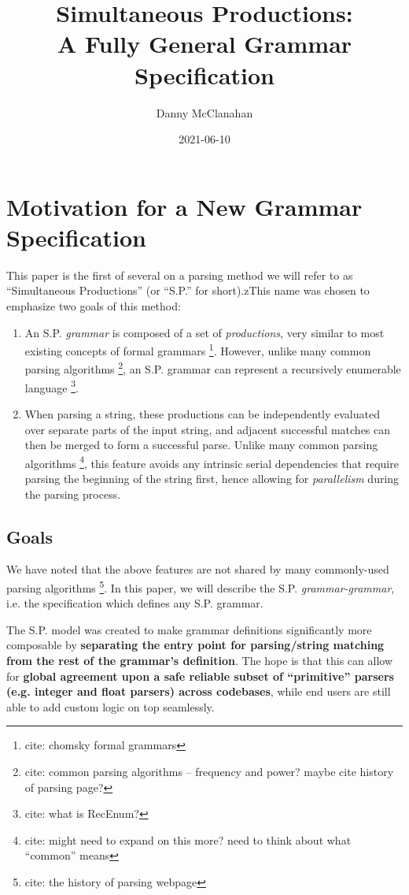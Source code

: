 \documentclass[10pt]{article}
\title{Simultaneous Productions: \\ A Fully General Grammar Specification}
\date{2021-06-10}
\author{Danny McClanahan}
\newcommand{\todocite}[1]{\footnote{cite: #1}}
\begin{document}
\maketitle
\tableofcontents

\section{Motivation for a New Grammar Specification}
\label{sec:motivation}

This paper is the first of several on a parsing method we will refer to as ``Simultaneous Productions'' (or ``S.P.'' for short).zThis name was chosen to emphasize two goals of this method:
\begin{enumerate}
  \item An S.P. \textit{grammar} is composed of a set of \textit{productions}, very similar to most existing concepts of formal grammars \todocite{chomsky formal grammars}. However, unlike many common parsing algorithms \todocite{common parsing algorithms -- frequency and power? maybe cite history of parsing page?}, an S.P. grammar can represent a recursively enumerable language \todocite{what is RecEnum?}.
  \item When parsing a string, these productions can be independently evaluated over separate parts of the input string, and adjacent successful matches can then be merged to form a successful parse. Unlike many common parsing algorithms \todocite{might need to expand on this more? need to think about what ``common'' means}, this feature avoids any intrinsic serial dependencies that require parsing the beginning of the string first, hence allowing for \textit{parallelism} during the parsing process.
\end{enumerate}

\subsection{Goals}
\label{sec:goals}
We have noted that the above features are not shared by many commonly-used parsing algorithms \todocite{the history of parsing webpage}. In this paper, we will describe the S.P. \textit{grammar-grammar}, i.e. the specification which defines any S.P. grammar.

The S.P. model was created to make grammar definitions significantly more composable by \textbf{separating the entry point for parsing/string matching from the rest of the grammar's definition}. The hope is that this can allow for \textbf{global agreement upon a safe reliable subset of ``primitive'' parsers (e.g. integer and float parsers) across codebases}, while end users are still able to add custom logic on top seamlessly.
\end{document}
